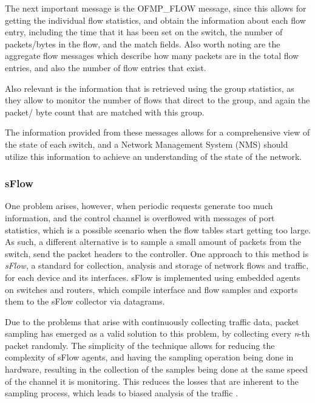 \par The next important message is the \textsc{OFMP\_FLOW} message, since this allows for getting the individual flow statistics, and obtain the information about
each flow entry, including the time that it has been set on the switch, the number of packets/bytes in the flow, and the match fields. Also worth noting are the 
aggregate flow messages which describe how many packets are in the total flow entries, and also the number of flow entries that exist.

\par Also relevant is the information that is retrieved using the group statistics, as they allow to monitor the number of flows that direct to the group, and again
the packet/ byte count that are matched with this group.

\par The information provided from these messages allows for a comprehensive view of the state of each switch, and a Network Management System (NMS) should utilize
this information to achieve an understanding of the state of the network. 

\subsubsection {sFlow} \label{sec:sflow}

One problem arises, however, when periodic requests generate too much information, and the control channel is overflowed with messages of port statistics, which is
a possible scenario when the flow tables start getting too large. As such, a different alternative is to sample a small amount of packets from the switch, send the
packet headers to the controller. One approach to this method is \textit{sFlow}, a standard for collection, analysis and storage of network flows and traffic, for 
each device and its interfaces. sFlow is implemented using embedded agents on switches and routers, which compile interface and flow samples and exports them to the 
sFlow collector via datagrams. 

\par Due to the problems that arise with continuously collecting traffic data, packet sampling has emerged as a valid solution to this problem, by collecting every
\textit{n}-th packet randomly. The simplicity of the technique allows for reducing the complexity of sFlow agents, and having the sampling operation being done in 
hardware, resulting in the collection of the samples being done at the same speed of the channel it is monitoring. This reduces the losses that are inherent to the
sampling process, which leads to biased analysis of the traffic \cite{brauckhoff_impact_2006}.

